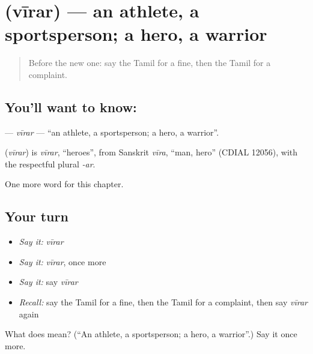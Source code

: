 \section[\texorpdfstring{\ta{வீரர்} (vīrar)}{வீரர் (vīrar)}]{ (vīrar) — an athlete, a sportsperson; a hero, a warrior}

\label{lesson:TA-C280-virar}



\begin{quote}
Before the new one: say the Tamil for a fine, then the Tamil for a complaint.
\end{quote}

\subsection*{You'll want to know: }
\textbf{} — \emph{vīrar} — \textquotedblleft{}an athlete, a sportsperson; a hero, a warrior\textquotedblright{}.

\begin{cousinweb}
\textbf{} (\emph{vīrar}) is \emph{vīrar}, \textquotedblleft{}heroes\textquotedblright{}, from Sanskrit \emph{vīra}, \textquotedblleft{}man, hero\textquotedblright{} (CDIAL 12056), with the respectful plural \emph{-ar}.
\end{cousinweb}

\begin{grammarlens}[title={What you've built}]
One more word for this chapter.
\end{grammarlens}

\subsection*{Your turn}
\begin{itemize}
\raggedright
  \item \emph{Say it:} \emph{vīrar}
  \item \emph{Say it:} \emph{vīrar}, once more
  \item \emph{Say it:} say \emph{vīrar}
  \item \emph{Recall:} say the Tamil for a fine, then the Tamil for a complaint, then say \emph{vīrar} again
\end{itemize}

\begin{tcolorbox}[breakable,colback=teal!4,colframe=teal!35!black,title={Before you move on}]
What does  mean? (\textquotedblleft{}An athlete, a sportsperson; a hero, a warrior\textquotedblright{}.) Say it once more.
\end{tcolorbox}

